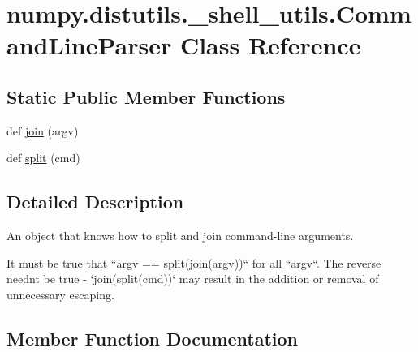\hypertarget{classnumpy_1_1distutils_1_1__shell__utils_1_1CommandLineParser}{}\section{numpy.\+distutils.\+\_\+shell\+\_\+utils.\+Command\+Line\+Parser Class Reference}
\label{classnumpy_1_1distutils_1_1__shell__utils_1_1CommandLineParser}
\subsection*{Static Public Member Functions}
\begin{DoxyCompactItemize}
\item 
def \hyperlink{classnumpy_1_1distutils_1_1__shell__utils_1_1CommandLineParser_aa74237461653bf0039b45976bfe69a98}{join} (argv)
\item 
def \hyperlink{classnumpy_1_1distutils_1_1__shell__utils_1_1CommandLineParser_ae9b138499950f10a45e3a152bddfe781}{split} (cmd)
\end{DoxyCompactItemize}


\subsection{Detailed Description}
\begin{DoxyVerb}An object that knows how to split and join command-line arguments.

It must be true that ``argv == split(join(argv))`` for all ``argv``.
The reverse neednt be true - `join(split(cmd))` may result in the addition
or removal of unnecessary escaping.
\end{DoxyVerb}
 

\subsection{Member Function Documentation}
\mbox{\label{classnumpy_1_1distutils_1_1__shell__utils_1_1CommandLineParser_aa74237461653bf0039b45976bfe69a98}} 
